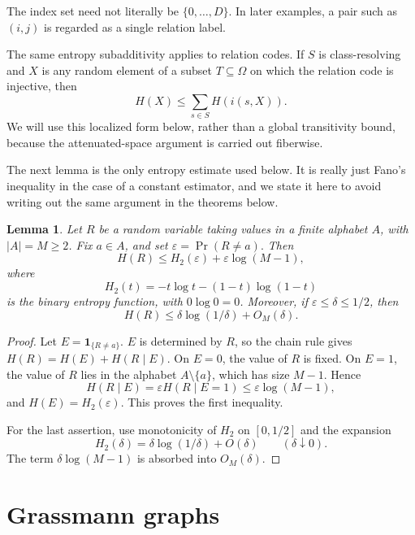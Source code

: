 \documentclass[11pt]{article}
\newtheorem{lemma}[theorem]{Lemma}
\theoremstyle{definition}
\theoremstyle{remark}
\begin{document}
The index set need not literally be \(\{0,\ldots,D\}\).  In later
examples, a pair such as \((i,j)\) is regarded as a single relation label.

The same entropy subadditivity applies to relation codes. If \(S\) is
class-resolving and \(X\) is any random element of a subset 
\(T\subseteq\Omega\)
on which the relation code is injective, then
\[
H(X)\le \sum_{s\in S} H(i(s,X)).
\]
We will use this localized form below, rather than a global transitivity
bound, because the attenuated-space argument is carried out fiberwise.


The next lemma is the only entropy estimate used below.  It is really just 
Fano's inequality in the case of a constant estimator, and we state it 
here to avoid writing out the same argument in the theorems below.

\begin{lemma}\label{lem:default}
Let \(R\) be a random variable taking values in a finite alphabet \(A\), 
with
\(|A|=M\geq2\).  Fix \(a\in A\), and set \(\varepsilon=\Pr(R\neq a).\)
Then
\[
        H(R)\leq H_2(\varepsilon)+\varepsilon\log(M-1),
\]
where
\[
        H_2(t)=-t\log t-(1-t)\log(1-t)
\]
is the binary entropy function, with \(0\log0=0\).
Moreover, if \(\varepsilon\leq\delta\leq1/2\), then
\[
        H(R)\leq \delta\log(1/\delta)+O_M(\delta).
\]
\end{lemma}

\begin{proof}
Let \(E=\mathbf 1_{\{R\neq a\}}\). \(E\) is determined by \(R\), so the 
chain rule gives \( H(R)=H(E)+H(R\mid E)\). On \(E=0\), the value of \(R\) 
is fixed.  On \(E=1\), the value of \(R\) lies in the alphabet 
\(A\setminus\{a\}\), which has size \(M-1\).  Hence
\[
        H(R\mid E)
        =
        \varepsilon H(R\mid E=1)
        \leq
        \varepsilon\log(M-1),
\]
and \(H(E)=H_2(\varepsilon)\).  This proves the first inequality.

For the last assertion, use monotonicity of \(H_2\) on \([0,1/2]\) and the 
expansion
\[
        H_2(\delta)=\delta\log(1/\delta)+O(\delta)
        \qquad(\delta\downarrow0).
\]
The term \(\delta\log(M-1)\) is absorbed into \(O_M(\delta)\).
\end{proof}



\section{Grassmann graphs}\label{sec:grassmann}
\end{document}
